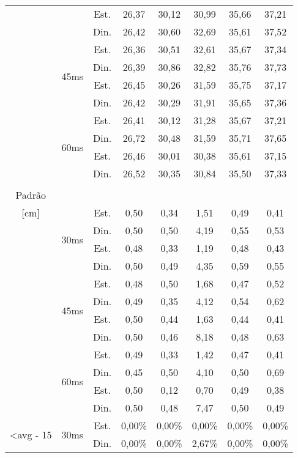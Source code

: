 \begin{center}
\begin{longtable}{|c|c|c|ccccc|}
 &  & Est. & 26,37 & 30,12 & 30,99 & 35,66 & 37,21 \\
 &  & Din. & 26,42 & 30,60 & 32,69 & 35,61 & 37,52 \\ \cline{2-8} 
 & \multirow{4}{*}{45ms} & Est. & 26,36 & 30,51 & 32,61 & 35,67 & 37,34 \\
 &  & Din. & 26,39 & 30,86 & 32,82 & 35,76 & 37,73 \\
 &  & Est. & 26,45 & 30,26 & 31,59 & 35,75 & 37,17 \\
 &  & Din. & 26,42 & 30,29 & 31,91 & 35,65 & 37,36 \\ \cline{2-8} 
 & \multirow{4}{*}{60ms} & Est. & 26,41 & 30,12 & 31,28 & 35,67 & 37,21 \\
 &  & Din. & 26,72 & 30,48 & 31,59 & 35,71 & 37,65 \\
 &  & Est. & 26,46 & 30,01 & 30,38 & 35,61 & 37,15 \\
 &  & Din. & 26,52 & 30,35 & 30,84 & 35,50 & 37,33 \\ \hline \pagebreak
\multirow{12}{*}{\begin{tabular}[c]{@{}c@{}}Desvio\\ Padrão\\ {[}cm{]}\end{tabular}} & \multirow{4}{*}{30ms} & Est. & 0,50 & 0,34 & 1,51 & 0,49 & 0,41 \\
 &  & Din. & 0,50 & 0,50 & 4,19 & 0,55 & 0,53 \\
 &  & Est. & 0,48 & 0,33 & 1,19 & 0,48 & 0,43 \\
 &  & Din. & 0,50 & 0,49 & 4,35 & 0,59 & 0,55 \\ \cline{2-8} 
 & \multirow{4}{*}{45ms} & Est. & 0,48 & 0,50 & 1,68 & 0,47 & 0,52 \\
 &  & Din. & 0,49 & 0,35 & 4,12 & 0,54 & 0,62 \\
 &  & Est. & 0,50 & 0,44 & 1,63 & 0,44 & 0,41 \\
 &  & Din. & 0,50 & 0,46 & 8,18 & 0,48 & 0,63 \\ \cline{2-8} 
 & \multirow{4}{*}{60ms} & Est. & 0,49 & 0,33 & 1,42 & 0,47 & 0,41 \\
 &  & Din. & 0,45 & 0,50 & 4,10 & 0,50 & 0,69 \\
 &  & Est. & 0,50 & 0,12 & 0,70 & 0,49 & 0,38 \\
 &  & Din. & 0,50 & 0,48 & 7,47 & 0,50 & 0,49 \\ \hline
\multirow{12}{*}{\textless avg - 15} & \multirow{4}{*}{30ms} & Est. & 0,00\% & 0,00\% & 0,00\% & 0,00\% & 0,00\% \\
 &  & Din. & 0,00\% & 0,00\% & 2,67\% & 0,00\% & 0,00\% \\

\end{longtable}
\end{center}
